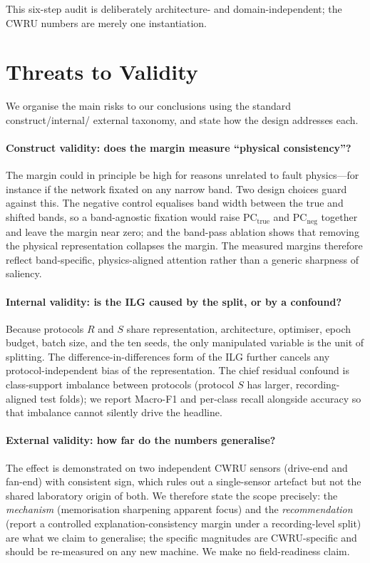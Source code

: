 \documentclass[11pt]{article}
\begin{document}
This six-step audit is deliberately architecture- and domain-independent; the CWRU numbers
are merely one instantiation.

\section{Threats to Validity}
We organise the main risks to our conclusions using the standard construct/internal/
external taxonomy, and state how the design addresses each.

\paragraph{Construct validity: does the margin measure ``physical consistency''?}
The margin could in principle be high for reasons unrelated to fault physics---for
instance if the network fixated on any narrow band. Two design choices guard against this.
The negative control equalises band width between the true and shifted bands, so a
band-agnostic fixation would raise $\mathrm{PC_{true}}$ and $\mathrm{PC_{neg}}$ together and
leave the margin near zero; and the band-pass ablation shows that removing the physical
representation collapses the margin. The measured margins therefore reflect band-specific,
physics-aligned attention rather than a generic sharpness of saliency.

\paragraph{Internal validity: is the ILG caused by the split, or by a confound?}
Because protocols $R$ and $S$ share representation, architecture, optimiser, epoch budget,
batch size, and the ten seeds, the only manipulated variable is the unit of splitting.
The difference-in-differences form of the ILG further cancels any protocol-independent bias
of the representation. The chief residual confound is class-support imbalance between
protocols (protocol $S$ has larger, recording-aligned test folds); we report Macro-F1 and
per-class recall alongside accuracy so that imbalance cannot silently drive the headline.

\paragraph{External validity: how far do the numbers generalise?}
The effect is demonstrated on two independent CWRU sensors (drive-end and fan-end) with
consistent sign, which rules out a single-sensor artefact but not the shared laboratory
origin of both. We therefore state the scope precisely: the \emph{mechanism} (memorisation
sharpening apparent focus) and the \emph{recommendation} (report a controlled
explanation-consistency margin under a recording-level split) are what we claim to
generalise; the specific magnitudes are CWRU-specific and should be re-measured on any new
machine. We make no field-readiness claim.
\end{document}

